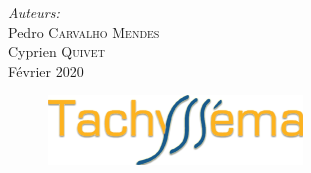 \begin{titlepage}
  \Large \emph{Auteurs:}\\
  Pedro \textsc{Carvalho Mendes}\\ %
  Cyprien \textsc{Quivet}\\[3cm] %
  
  
  {\Large Février 2020}\\[2cm] %
  
  \vfill %
  \begin{figure}[b]
    \centering
    \includegraphics{img/LogoTachyssema.png}\\[1cm] %
    \label{fig:LogoTachyssema}
  \end{figure}
    
  
   
  
  \end{titlepage}